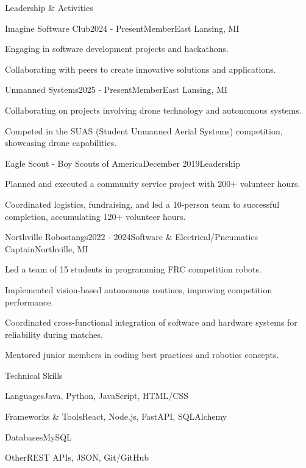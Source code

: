 \documentclass[
	11pt
]{resume}
\begin{document}
	\begin{rSection}{Leadership \& Activities}
		\begin{rSectionEntry}{Imagine Software Club}{2024 - Present}{Member}{East Lansing, MI}
			\item Engaging in software development projects and hackathons.
			\item Collaborating with peers to create innovative solutions and applications.
		\end{rSectionEntry}

		\begin{rSectionEntry}{Unmanned Systems}{2025 - Present}{Member}{East Lansing, MI}
			\item Collaborating on projects involving drone technology and autonomous systems.
			\item Competed in the SUAS (Student Unmanned Aerial Systems) competition, showcasing drone capabilities.
		\end{rSectionEntry}
		
		\begin{rSectionEntry}{Eagle Scout - Boy Scouts of America}{December 2019}{Leadership}{}
			\item Planned and executed a community service project with 200+ volunteer hours.
			\item Coordinated logistics, fundraising, and led a 10-person team to successful completion, accumulating 120+ volunteer hours.
		\end{rSectionEntry}

		\begin{rSectionEntry}{Northville Robostangs}{2022 - 2024}{Software \& Electrical/Pneumatics Captain}{Northville, MI}
			\item Led a team of 15 students in programming FRC competition robots.
			\item Implemented vision-based autonomous routines, improving competition performance.
			\item Coordinated cross-functional integration of software and hardware systems for reliability during matches.
			\item Mentored junior members in coding best practices and robotics concepts.
		\end{rSectionEntry}
	\end{rSection}

	\begin{rSection}{Technical Skills}
		\begin{rSet}{Languages}{Java, Python, JavaScript, HTML/CSS}
		\end{rSet}
		\begin{rSet}{Frameworks \& Tools}{React, Node.js, FastAPI, SQLAlchemy}
		\end{rSet}
		\begin{rSet}{Databases}{MySQL}
		\end{rSet}
		\begin{rSet}{Other}{REST APIs, JSON, Git/GitHub}
		\end{rSet}
	\end{rSection}
\end{document}
